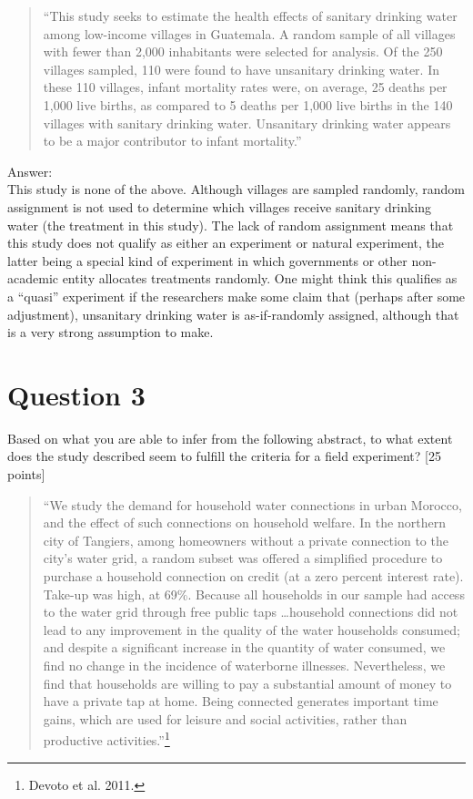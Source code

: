 \documentclass[11pt,notitlepage]{article}		%
\begin{document}
\begin{quote}
``This study seeks to estimate the health effects of sanitary drinking water among low-income villages in Guatemala. A random sample of all villages with fewer than 2,000 inhabitants were selected for analysis. Of the 250 villages sampled, 110 were found to have unsanitary drinking water. In these 110 villages, infant mortality rates were, on average, 25 deaths per 1,000 live births, as compared to 5 deaths per 1,000 live births in the 140 villages with sanitary drinking water. Unsanitary drinking water appears to be a major contributor to infant mortality.''
\end{quote}
Answer:\\
This study is none of the above. Although villages are sampled randomly, random assignment is not used to determine which villages receive sanitary drinking water (the treatment in this study). The lack of random assignment means that this study does not qualify as either an experiment or natural experiment, the latter being a special kind of experiment in which governments or other non-academic entity allocates treatments randomly. One might think this qualifies as a ``quasi'' experiment if the researchers make some claim that (perhaps after some adjustment), unsanitary drinking water is as-if-randomly assigned, although that is a very strong assumption to make.

\section*{Question 3}
Based on what you are able to infer from the following abstract, to what extent does the study described seem to fulfill the criteria for a field experiment? [25 points]

\begin{quote}
``We study the demand for household water connections in urban Morocco, and the effect of such connections on household welfare. In the northern city of Tangiers, among homeowners without a private connection to the city's water grid, a random subset was offered a simplified procedure to purchase a household connection on credit (at a zero percent interest rate). Take-up was high, at 69\%. Because all households in our sample had access to the water grid through free public taps \ldots household connections did not lead to any improvement in the quality of the water households consumed; and despite a significant increase in the quantity of water consumed, we find no change in the incidence of waterborne illnesses. Nevertheless, we find that households are willing to pay a substantial amount of money to have a private tap at home. Being connected generates important time gains, which are used for leisure and social activities, rather than productive activities.''\footnote{Devoto et al. 2011.}
\end{quote}
\end{document}
